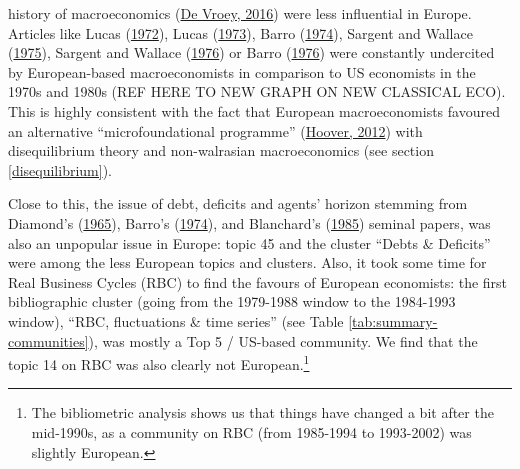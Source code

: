 \documentclass[]{elsarticle} %
\begin{document}
history of macroeconomics (\protect\hyperlink{ref-devroey2016}{De Vroey,
2016}) were less influential in Europe. Articles like Lucas
(\protect\hyperlink{ref-lucas1972}{1972}), Lucas
(\protect\hyperlink{ref-lucas1973}{1973}), Barro
(\protect\hyperlink{ref-barro1974}{1974}), Sargent and Wallace
(\protect\hyperlink{ref-sargent1975}{1975}), Sargent and Wallace
(\protect\hyperlink{ref-sargent1976}{1976}) or Barro
(\protect\hyperlink{ref-barro1976}{1976}) were constantly undercited by
European-based macroeconomists in comparison to US economists in the
1970s and 1980s (REF HERE TO NEW GRAPH ON NEW CLASSICAL ECO). This is
highly consistent with the fact that European macroeconomists favoured
an alternative ``microfoundational programme''
(\protect\hyperlink{ref-hoover2012}{Hoover, 2012}) with disequilibrium
theory and non-walrasian macroeconomics (see section
\ref{disequilibrium}).

Close to this, the issue of debt, deficits and agents' horizon stemming
from Diamond's (\protect\hyperlink{ref-diamond1965}{1965}), Barro's
(\protect\hyperlink{ref-barro1974}{1974}), and Blanchard's
(\protect\hyperlink{ref-blanchard1985}{1985}) seminal papers, was also
an unpopular issue in Europe: topic 45 and the cluster ``Debts \&
Deficits'' were among the less European topics and clusters. Also, it
took some time for Real Business Cycles (RBC) to find the favours of
European economists: the first bibliographic cluster (going from the
1979-1988 window to the 1984-1993 window), ``RBC, fluctuations \& time
series'' (see Table \ref{tab:summary-communities}), was mostly a Top 5 /
US-based community. We find that the topic 14 on RBC was also clearly
not European.\footnote{The bibliometric analysis shows us that things
  have changed a bit after the mid-1990s, as a community on RBC (from
  1985-1994 to 1993-2002) was slightly European.}
\end{document}
